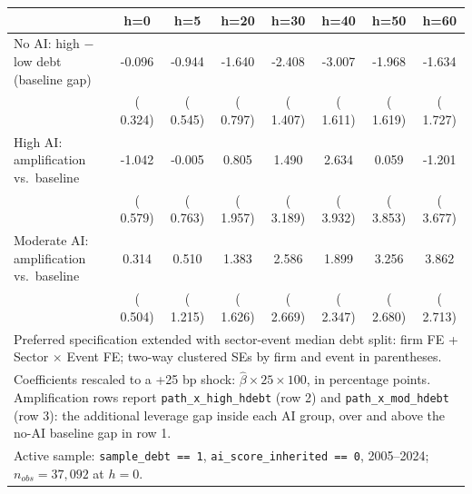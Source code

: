 \begin{tabular}{lccccccc}\hline\hline
 & h=0 & h=5 & h=20 & h=30 & h=40 & h=50 & h=60 \\
\hline
No AI: high $-$ low debt (baseline gap) & -0.096 & -0.944 & -1.640 & -2.408 & -3.007 & -1.968 & -1.634 \\
 & ( 0.324) & ( 0.545) & ( 0.797) & ( 1.407) & ( 1.611) & ( 1.619) & ( 1.727) \\
High AI: amplification vs.\ baseline & -1.042 & -0.005 &  0.805 &  1.490 &  2.634 &  0.059 & -1.201 \\
 & ( 0.579) & ( 0.763) & ( 1.957) & ( 3.189) & ( 3.932) & ( 3.853) & ( 3.677) \\
Moderate AI: amplification vs.\ baseline &  0.314 &  0.510 &  1.383 &  2.586 &  1.899 &  3.256 &  3.862 \\
 & ( 0.504) & ( 1.215) & ( 1.626) & ( 2.669) & ( 2.347) & ( 2.680) & ( 2.713) \\
\hline\hline
\multicolumn{8}{l}{\footnotesize Preferred specification extended with sector-event median debt split: firm FE + Sector $\times$ Event FE; two-way clustered SEs by firm and event in parentheses.} \\
\multicolumn{8}{l}{\footnotesize Coefficients rescaled to a +25 bp shock: $\hat\beta \times 25 \times 100$, in percentage points. Amplification rows report \texttt{path\_x\_high\_hdebt} (row 2) and \texttt{path\_x\_mod\_hdebt} (row 3): the additional leverage gap inside each AI group, over and above the no-AI baseline gap in row 1.} \\
\multicolumn{8}{l}{\footnotesize Active sample: \texttt{sample\_debt == 1}, \texttt{ai\_score\_inherited == 0}, 2005--2024; $n_{obs} = 37{,}092$ at $h = 0$.} \\
\end{tabular}
